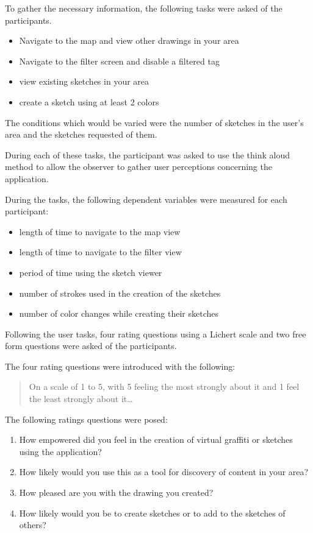\documentclass{chi2009}
\begin{document}
To gather the necessary information, the following tasks were asked of the
participants.

\begin{itemize}
\item Navigate to the map and view other drawings in your area
\item Navigate to the filter screen and disable a filtered tag
\item view existing sketches in your area
\item create a sketch using at least 2 colors
\end{itemize}

The conditions which would be varied were the number of sketches in the user's
area and the sketches requested of them.

During each of these tasks, the participant was asked to use the think aloud
method to allow the observer to gather user perceptions concerning the
application.

During the tasks, the following dependent variables were measured for each participant:

\begin{itemize}
\item length of time to navigate to the map view
\item length of time to navigate to the filter view
\item period of time using the sketch viewer
\item number of strokes used in the creation of the sketches
\item number of color changes while creating their sketches
\end{itemize}

Following the user tasks, four rating questions using a Lichert scale and two
free form questions were asked of the participants.

The four rating questions were introduced with the following:
\begin{quote}
On a scale of 1 to 5, with 5 feeling the most strongly about it and 1 feel the
least strongly about it\ldots
\end{quote}

The following ratings questions were posed:
\begin{enumerate}
\item How empowered did you feel in the creation of virtual graffiti or sketches using the application?
\item How likely would you use this as a tool for discovery of content in your area?
\item How pleased are you with the drawing you created?
\item How likely would you be to create sketches or to add to the sketches of others?
\end{enumerate}
\end{document}
